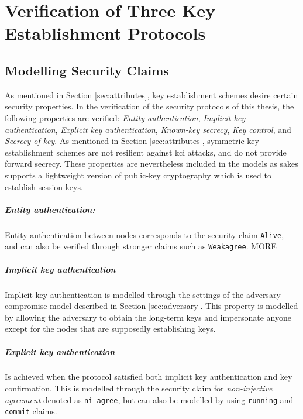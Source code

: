 \chapter{Verification of Three Key Establishment Protocols}
\label{chp:analysis}


\section{Modelling Security Claims}

As mentioned in Section \ref{sec:attributes}, key establishment schemes desire certain security properties. In the verification of the security protocols of this thesis, the following properties are verified: \emph{Entity authentication}, \emph{Implicit key authentication}, \emph{Explicit key authentication}, \emph{Known-key secrecy}, \emph{Key control}, and \emph{Secrecy of key}. As mentioned in Section \ref{sec:attributes}, symmetric key establishment schemes are not resilient against \gls{kci} attacks, and do not provide forward secrecy. These properties are nevertheless included in the models as \gls{sakes} supports a lightweight version of public-key cryptography which is used to establish session keys.

\paragraph{Entity authentication:} Entity authentication between nodes corresponds to the security claim \texttt{Alive}, and can also be verified through stronger claims such as \texttt{Weakagree}. MORE %

\paragraph{Implicit key authentication} Implicit key authentication is modelled through the settings of the adversary compromise model described in Section \ref{sec:adversary}. This property is modelled by allowing the adversary to obtain the long-term keys and impersonate anyone except for the nodes that are supposedly establishing keys.

\paragraph{Explicit key authentication} Is achieved when the protocol satisfied both implicit key authentication and key confirmation. This is modelled through the security claim for \emph{non-injective agreement} denoted as \texttt{ni-agree}, but can also be modelled by using \texttt{running} and \texttt{commit} claims.

